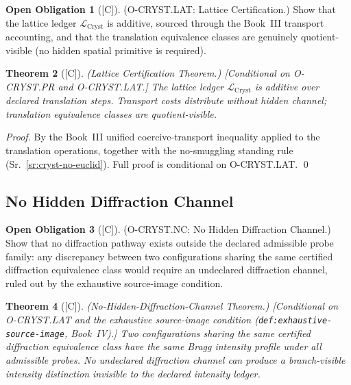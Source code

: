 \documentclass[12pt,oneside]{amsbook}
\theoremstyle{plain}
\newtheorem{theorem}{Theorem}[section]
\theoremstyle{definition}
\newtheorem{obligation}[theorem]{Open Obligation}
\theoremstyle{remark}
\newcommand{\status}[1]{\textup{[#1]}}
\begin{document}
\begin{obligation}[\status{C}]\label{ob:cryst-LAT}
\textup{(O-CRYST.LAT: Lattice Certification.)}
Show that the lattice ledger $\mathcal{L}_{\mathrm{Cryst}}$ is
additive, sourced through the Book~III transport accounting, and
that the translation equivalence classes are genuinely
quotient-visible (no hidden spatial primitive is required).
\end{obligation}

\begin{theorem}[\status{C}]\label{thm:cryst-LAT}
\textup{(Lattice Certification Theorem.)}
\textup{[Conditional on O-CRYST.PR and O-CRYST.LAT.]}
The lattice ledger $\mathcal{L}_{\mathrm{Cryst}}$ is additive over
declared translation steps.  Transport costs distribute without
hidden channel; translation equivalence classes are
quotient-visible.
\end{theorem}

\begin{proof}
By the Book~III unified coercive-transport inequality applied to the
translation operations, together with the no-smuggling standing
rule (Sr.~\ref{sr:cryst-no-euclid}).  Full proof is conditional on
O-CRYST.LAT.
\qed
\end{proof}

\subsection{No Hidden Diffraction Channel}

\begin{obligation}[\status{C}]\label{ob:cryst-NC}
\textup{(O-CRYST.NC: No Hidden Diffraction Channel.)}
Show that no diffraction pathway exists outside the declared
admissible probe family: any discrepancy between two configurations
sharing the same certified diffraction equivalence class would
require an undeclared diffraction channel, ruled out by the
exhaustive source-image condition.
\end{obligation}

\begin{theorem}[\status{C}]\label{thm:cryst-NC}
\textup{(No-Hidden-Diffraction-Channel Theorem.)}
\textup{[Conditional on O-CRYST.LAT and the exhaustive source-image
condition (\texttt{def:exhaustive-source-image}, Book~IV).]}
Two configurations sharing the same certified diffraction equivalence
class have the same Bragg intensity profile under all admissible
probes.  No undeclared diffraction channel can produce a
branch-visible intensity distinction invisible to the declared
intensity ledger.
\end{theorem}
\end{document}
